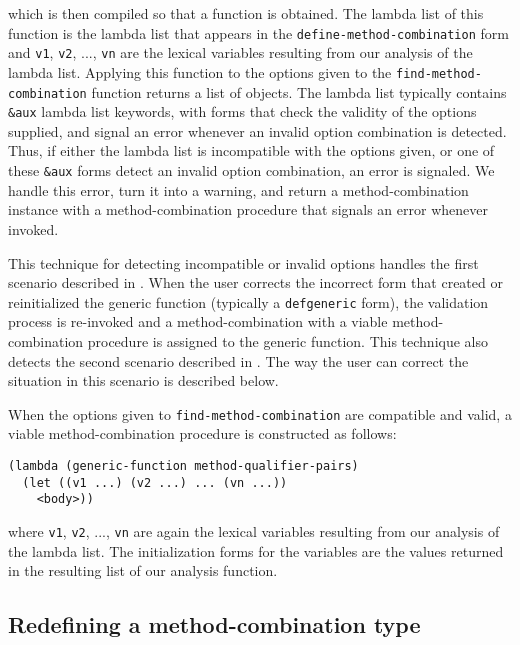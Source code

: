 \noindent
which is then compiled so that a function is obtained.  The lambda
list of this function is the lambda list that appears in the
\texttt{define-method-combination} form and \texttt{v1}, \texttt{v2},
..., \texttt{vn} are the lexical variables resulting from our analysis
of the lambda list.  Applying this function to the options given to
the \texttt{find-method-combination} function returns a list of
objects.  The lambda list typically contains \texttt{\&aux} lambda
list keywords, with forms that check the validity of the options
supplied, and signal an error whenever an invalid option combination
is detected.  Thus, if either the lambda list is incompatible with the
options given, or one of these \texttt{\&aux} forms detect an invalid
option combination, an error is signaled.  We handle this error, turn
it into a warning, and return a method-combination instance with a
method-combination procedure that signals an error whenever invoked.

This technique for detecting incompatible or invalid options handles
the first scenario described in .  When the
user corrects the incorrect form that created or reinitialized the
generic function (typically a \texttt{defgeneric} form), the
validation process is re-invoked and a method-combination with a
viable method-combination procedure is assigned to the generic
function.  This technique also detects the second scenario described
in .  The way the user can correct the
situation in this scenario is described below.

When the options given to \texttt{find-method-combination} are
compatible and valid, a viable method-combination procedure is
constructed as follows:

\begin{verbatim}
(lambda (generic-function method-qualifier-pairs)
  (let ((v1 ...) (v2 ...) ... (vn ...))
    <body>))
\end{verbatim}

\noindent
where \texttt{v1}, \texttt{v2}, ..., \texttt{vn} are again the lexical
variables resulting from our analysis of the lambda list.  The
initialization forms for the variables are the values returned in the
resulting list of our analysis function.

\subsection{Redefining a method-combination type}

